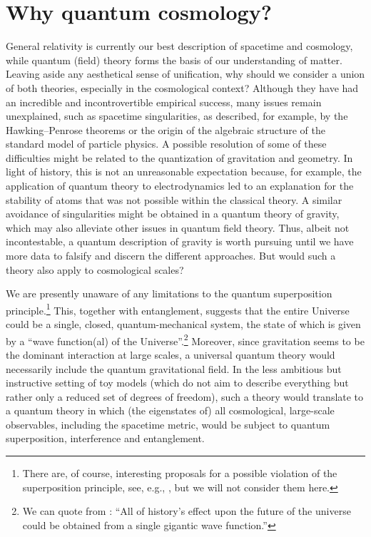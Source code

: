 \documentclass[12pt]{iopart}
\begin{document}
\section{\label{sec:why}Why quantum cosmology?}
General relativity is currently our best description of spacetime and cosmology, while quantum (field) theory forms the basis of our understanding of matter. Leaving aside any aesthetical sense of unification, why should we consider a union of both theories, especially in the cosmological context? Although they have had an incredible and incontrovertible empirical success, many issues remain unexplained, such as spacetime singularities, as described, for example, by the Hawking--Penrose theorems \citep{Hawking:1996jh,Senovilla:1998oua} or the origin of the algebraic structure of the standard model of particle physics. A possible resolution of some of these difficulties might be related to the quantization of gravitation and geometry. In light of history, this is not an unreasonable expectation because, for example, the application of quantum theory to electrodynamics led to an explanation for the stability of atoms that was not possible within the classical theory. A similar avoidance of singularities might be obtained in a quantum theory of gravity, which may also alleviate other issues in quantum field theory. Thus, albeit not incontestable, a quantum description of gravity is worth pursuing until we have more data to falsify and discern the different approaches. But would such a theory also apply to cosmological scales?

We are presently unaware of any limitations to the quantum superposition principle.\footnote{There are, of course, interesting proposals for a possible violation of the superposition principle, see, e.g., \citet{RevModPhys.85.471}, but we will not consider them here.} This, together with entanglement, suggests that the entire Universe could be a single, closed, quantum-mechanical system, the state of which is given by a ``wave function(al) of the Universe''.\footnote{We can quote from
\citet[p. 58]{feynman2010quantum}: ``All of history's effect upon the future of the universe could be obtained from a single gigantic wave function.''} Moreover, since gravitation seems to be the dominant interaction at large scales, a universal quantum theory would necessarily include the quantum gravitational field. In the less ambitious but instructive setting of toy models (which do not aim to describe everything but rather only a reduced set of degrees of freedom), such a theory would translate to a quantum theory in which (the eigenstates of) all cosmological, large-scale observables, including the spacetime metric, would be subject to quantum superposition, interference and entanglement.
\end{document}
